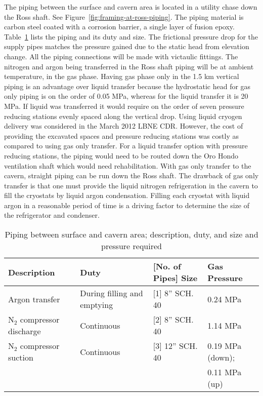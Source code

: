 The piping between the surface and cavern area is located in a utility 
chase down the Ross shaft. See Figure~\ref{fig:framing-at-ross-piping}. 
The piping material is carbon steel coated with a corrosion barrier,
a single layer of fusion epoxy. Table~\ref{table:pipelines} lists 
the piping and its duty 
and size. The frictional pressure drop for the supply pipes matches
the pressure gained due to the static head from elevation change. 
All the piping connections will be made with victaulic fittings. 
The nitrogen and argon 
being transferred in the Ross shaft piping will be at ambient 
temperature, in the gas phase. Having gas phase only in the 
1.5 km vertical piping is an advantage over liquid transfer 
because the hydrostatic head for gas only piping is on the order of
0.05 MPa, whereas for the liquid transfer it is 20 MPa. If 
liquid was transferred it would require on the order of
seven pressure reducing stations evenly spaced along the vertical drop.
Using liquid cryogen delivery was considered in the March 
2012 LBNE CDR. However, the cost of providing 
the excavated spaces and pressure reducing stations was costly 
as compared to using gas only transfer. For a liquid transfer
option with pressure reducing stations, the piping would need 
to be routed down the Oro Hondo ventilation shaft which would 
need rehabilitation. With gas 
only transfer to the cavern, straight piping can be run down 
the Ross shaft. The drawback of gas only transfer is that one 
must provide the liquid nitrogen refrigeration in the cavern 
to fill the cryostats by liquid argon condensation. Filling 
each cryostat with liquid argon in a reasonable period of 
time is a driving factor to determine the size of the 
refrigerator and condenser.

\begin{table}
\caption{Piping between surface and cavern area; description, duty, 
and size and pressure required}
\label{table:pipelines}
\begin{tabular}[htbp]{|p{}|p{}|p{}|p{}|}
\hline
{\bf Description} & {\bf Duty} & {\bf [No. of Pipes] Size} & {\bf Gas Pressure} \\
\hline\hline
Argon transfer   & During filling and emptying & [1] 8'' SCH. 40  &  0.24 MPa\\
\hline
N$_2$ compressor discharge & Continuous & [2] 8'' SCH. 40 & 1.14 MPa \\
\hline
N$_2$ compressor suction & Continuous & [3] 12'' SCH. 40 & 0.19 MPa (down);  \\
                         &            &                        & 0.11 MPa (up) \\
\hline\end{tabular} 
\end{table}

